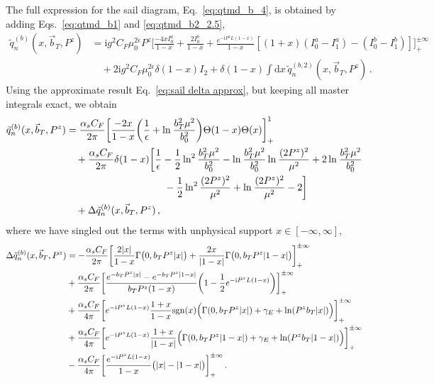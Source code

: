 \documentclass[11pt,a4paper]{article}
\DeclareRobustCommand{\eq}[1]{Eq.~\eqref{eq:#1}}
\DeclareRobustCommand{\eqs}[2]{Eqs.~\eqref{eq:#1} and \eqref{eq:#2}}
\newcommand{\df}{\mathrm{d}}
\newcommand{\img}{\mathrm{i}}
\newcommand{\eps}{\epsilon}
\newcommand{\nn}{\nonumber}
\newcommand{\as}{\alpha_s}
\newcommand{\Lb}[1]{\ln^{#1}\frac{b_T^2 \mu^2}{b_0^2}}
\newcommand{\LPz}[1]{\ln^{#1}\frac{(2 P^z)^2}{\mu^2}}
\newcommand{\bt}{\vec b_T}
\newcommand{\sgn}[1]{\mathrm{sgn}(#1)}
\newcommand{\plusinf}{_+^{\pm\infty}}
\begin{document}
The full expression for the sail diagram, \eq{qtmd_b_4}, is obtained by adding \eqs{qtmd_b1}{qtmd_b2_2.5},
\begin{align} \label{eq:qtmd_b2_5}
 \tilde q^{(b)}_n(x, \bt, P^z) &
 = \img g^2 C_F \mu_0^{2\eps} P^z \biggl [ \frac{-4x I_0^a}{1-x} + \frac{2 I_0^b}{1-x}
  + \frac{e^{-\img P^zL (1-x) }}{1-x} \left[ (1+x) (I_0^a - I_1^a) - (I_0^b - I_1^b) \right]
  \biggr]\plusinf
 \nn\\&\quad
 + 2 \img g^2 C_F \mu_0^{2\eps} \delta(1-x) I_2
  + \delta(1-x) \int \df x \, \tilde q^{(b,2)}_n(x, \bt, P^z)
\,.\end{align}
Using the approximate result \eq{sail delta approx}, but keeping all master integrals exact,
we obtain
\begin{align} \label{eq:qtmd_b}
 \tilde q^{(b)}_n(x, \bt, P^z) &
 = \frac{\as C_F}{2\pi}  \biggl [ \frac{-2x}{1-x}  \biggl(\frac{1}{\eps} + \Lb{}\biggr)\Theta(1-x)\Theta(x) \biggr]_+^1
   \nn\\*&\quad
   + \frac{\as C_F}{2\pi} \delta(1-x) \biggl[\frac{1}{\eps} - \frac{1}{2} \Lb{2}
     - \Lb{} \LPz{}  + 2\Lb{}
     \nn\\*&\hspace{3.5cm}
     - \frac{1}{2} \LPz{2} + \LPz{} - 2 \biggr]
   \nn\\*&\quad
   + \Delta \tilde q^{(b)}_n(x, \bt, P^z)
\,,\end{align}
where we have singled out the terms with unphysical support $x \in [-\infty,\infty]$,
\begin{align} \label{eq:qtmd_b_suppressed}
 \Delta\tilde q^{(b)}_n(x, \bt, P^z) &=
 - \frac{\as C_F}{2\pi}  \biggl [ \frac{2|x|}{1-x} \Gamma\bigl(0, b_T P^z |x|\bigr)
   + \frac{2x}{|1-x|} \Gamma\bigl(0, b_T P^z |1-x|\bigr) \biggr]\plusinf
\nn\\*&
 + \frac{\as C_F}{2\pi} \biggl [ \frac{e^{-b_T P^z |x|} - e^{-b_T P^z |1-x|}}{b_T P^z (1-x)}
   \biggl(1 -\frac{1}{2} e^{-\img P^zL (1-x)} \biggr) \biggr]\plusinf
\nn\\*&
 + \frac{\as C_F}{4\pi} \biggl [
  e^{-\img P^zL (1-x)} \frac{1+x}{1-x} \sgn{x} \Bigl(\Gamma(0, b_T P^z |x|) + \gamma_E + \ln(P^z b_T |x|) \Bigr)
  \biggr]\plusinf
\nn\\*&
 + \frac{\as C_F}{4\pi} \biggl [
  e^{-\img P^zL (1-x)} \frac{1+x}{|1-x|} \Bigl(\Gamma(0, b_T P^z |1-x|) + \gamma_E + \ln(P^z b_T |1-x|) \Bigr)
  \biggr]\plusinf
\nn\\*&
 - \frac{\as C_F}{4\pi}  \biggl [
  \frac{e^{-\img P^zL (1-x) }}{1-x} \bigl( |x| - |1-x| \bigr)
  \biggr]\plusinf
\,.\end{align}
\end{document}
